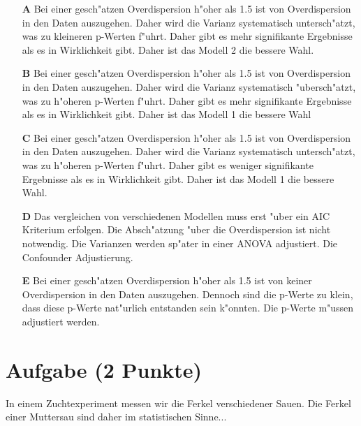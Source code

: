 \documentclass[a4paper, 10pt]{scrartcl}\usepackage[]{graphicx}\usepackage[]{xcolor}
\begin{document}
\begin{enumerate}
\item [\textbf{A} \msquare] Bei einer gesch{"a}tzen Overdispersion h{"o}her als 1.5 ist von Overdispersion in den Daten auszugehen. Daher wird die Varianz systematisch untersch{"a}tzt, was zu kleineren p-Werten f{"u}hrt. Daher gibt es mehr signifikante Ergebnisse als es in Wirklichkeit gibt. Daher ist das Modell 2 die bessere Wahl.
\item [\textbf{B} \msquare] Bei einer gesch{"a}tzen Overdispersion h{"o}her als 1.5 ist von Overdispersion in den Daten auszugehen. Daher wird die Varianz systematisch {"u}bersch{"a}tzt, was zu h{"o}heren p-Werten f{"u}hrt. Daher gibt es mehr signifikante Ergebnisse als es in Wirklichkeit gibt. Daher ist das Modell 1 die bessere Wahl
\item [\textbf{C} \msquare] Bei einer gesch{"a}tzen Overdispersion h{"o}her als 1.5 ist von Overdispersion in den Daten auszugehen. Daher wird die Varianz systematisch untersch{"a}tzt, was zu h{"o}heren p-Werten f{"u}hrt. Daher gibt es weniger signifikante Ergebnisse als es in Wirklichkeit gibt. Daher ist das Modell 1 die bessere Wahl.
\item [\textbf{D} \msquare] Das vergleichen von verschiedenen Modellen muss erst {"u}ber ein AIC Kriterium erfolgen. Die Absch{"a}tzung {"u}ber die Overdispersion ist nicht notwendig. Die Varianzen werden sp{"a}ter in einer ANOVA adjustiert. Die Confounder Adjustierung.
\item [\textbf{E} \msquare] Bei einer gesch{"a}tzen Overdispersion h{"o}her als 1.5 ist von keiner Overdispersion in den Daten auszugehen. Dennoch sind die p-Werte zu klein, dass diese p-Werte nat{"u}rlich entstanden sein k{"o}nnten. Die p-Werte m{"u}ssen adjustiert werden.
\end{enumerate}

\section{Aufgabe \hfill (2 Punkte)}

In einem Zuchtexperiment messen wir die Ferkel verschiedener Sauen. Die
Ferkel einer Muttersau sind daher im statistischen Sinne... 
\end{document}
